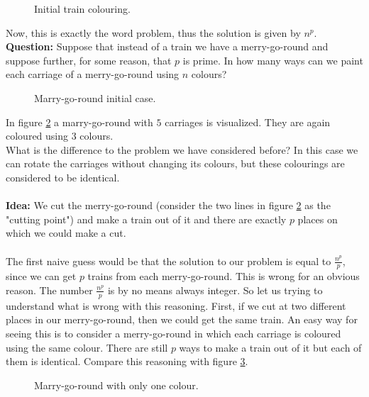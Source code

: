 \begin{figure}[ht]
    \centering
    \caption{Initial train colouring.}
    \label{fig:marrygoroundtrain}
\end{figure}

Now, this is exactly the word problem, thus the solution is given by $n^p$.
\\
\noindent
\textbf{Question:} Suppose that instead of a train we have a merry-go-round and suppose further, for some reason, that $p$ is prime. 
In how many ways can we paint each carriage of a merry-go-round using $n$ colours?

\begin{figure}[ht!]
    \centering
    \caption{Marry-go-round initial case.}
    \label{fig:marrygoroundinitialcase}
\end{figure}

In figure \ref{fig:marrygoroundinitialcase} a marry-go-round with $5$ carriages is visualized. They are again coloured using $3$ colours.\\
What is the difference to the problem we have considered before? In this case we can rotate the carriages without changing its colours, but these colourings are considered to be identical.
\\
\\
\textbf{Idea:} We cut the merry-go-round (consider the two lines in figure \ref{fig:marrygoroundinitialcase} as the "cutting point") and make a train out of it and there are exactly $p$ places on which we could make a cut.
\\
\\
The first naive guess would be that the solution to our problem is equal to $\frac{n^p}{p}$, since we can get $p$ trains from each merry-go-round. This is wrong for an obvious reason. The number $\frac{n^p}{p}$
is by no means always integer. So let us trying to understand what is wrong with this reasoning. First, if we cut at two different places in our merry-go-round, then we could get the same train. An easy way for seeing this
is to consider a merry-go-round in which each carriage is coloured using the same colour. There are still $p$ ways to make a train out of it but each of them is identical. Compare this reasoning with figure \ref{fig:marrygoroundonecolour}.

\begin{figure}[ht]
    \centering
    \caption{Marry-go-round with only one colour.}
    \label{fig:marrygoroundonecolour}
\end{figure}


